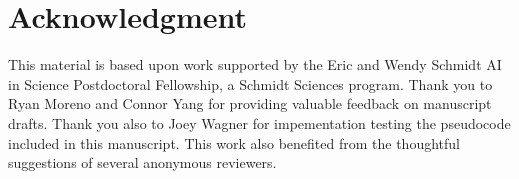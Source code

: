 \section*{Acknowledgment}

This material is based upon work supported by the Eric and Wendy Schmidt AI in Science Postdoctoral Fellowship, a Schmidt Sciences program.
Thank you to Ryan Moreno and Connor Yang for providing valuable feedback on manuscript drafts.
Thank you also to Joey Wagner for impementation testing the pseudocode included in this manuscript.
This work also benefited from the thoughtful suggestions of several anonymous reviewers.
